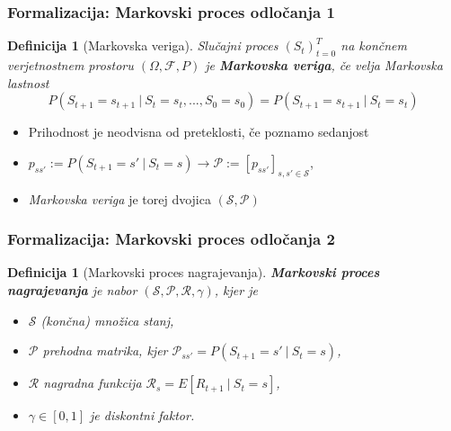\documentclass{beamer}    %
\newtheorem{definicija}[izrek]{Definicija}
\begin{document}
\begin{frame}
    \frametitle{Formalizacija: Markovski proces odločanja 1}
    \begin{definicija}[Markovska veriga]
        Slučajni proces $(S_t)_{t=0}^T$ na končnem verjetnostnem prostoru 
        $(\Omega, \mathcal{F}, P)$ je \textbf{Markovska veriga}, če velja Markovska lastnost
        $$
        P(S_{t+1} = s_{t+1}~|~S_{t} = s_{t}, ..., S_0 = s_0) = P(S_{t+1} = s_{t+1}~|~S_{t} = s_{t})
        $$
    \end{definicija}
    \pause
    \medskip
    \begin{itemize}
        \item Prihodnost je neodvisna od preteklosti, če poznamo sedanjost
        \pause
        \item $p_{ss'} := P(S_{t+1} = s'~|~S_{t} = s) \rightarrow
                \mathcal{P} := [p_{ss'}]_{s,s'\in \mathcal{S} }$, 
        \pause
        \item \emph{Markovska veriga} je torej dvojica $(\mathcal{S}, \mathcal{P})$
    \end{itemize}
    
\end{frame}


\begin{frame}
    \frametitle{Formalizacija: Markovski proces odločanja 2}
    \begin{definicija}[Markovski proces nagrajevanja]
        \textbf{Markovski proces nagrajevanja} je nabor 
        $(\mathcal{S}, \mathcal{P}, \mathcal{R}, \gamma)$, kjer je
        \begin{itemize}
            \item $\mathcal{S}$ (končna) množica stanj,
            \item $\mathcal{P}$ prehodna matrika, kjer $\mathcal{P}_{ss'} = P(S_{t+1} = s'~|~S_{t} = s)$,
            \item $\mathcal{R}$ nagradna funkcija $\mathcal{R}_s = E[R_{t+1}~|~S_{t} = s]$,
            \item $\gamma \in [0, 1]$ je diskontni faktor.
        \end{itemize}
    \end{definicija}
\end{frame}
\end{document}

